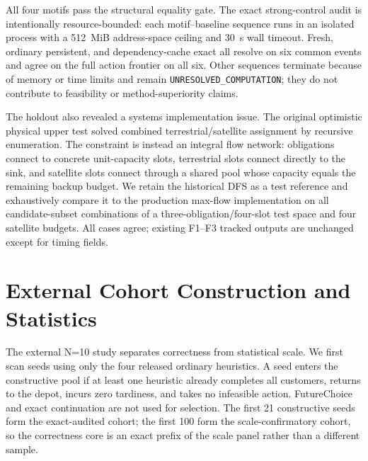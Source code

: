 \begin{table}[t]
\centering
\caption{B6 structural holdout. ``Inc.=fresh'' means every event-level incremental snapshot is canonically equal to a full fresh rebuild. Exact comparisons include only events where all three resource-bounded exact controls resolve.}
\label{tab:b6appendix}
\footnotesize

\end{table}

All four motifs pass the structural equality gate. The exact strong-control audit is intentionally resource-bounded: each motif--baseline sequence runs in an isolated process with a 512~MiB address-space ceiling and 30~s wall timeout. Fresh, ordinary persistent, and dependency-cache exact all resolve on six common events and agree on the full action frontier on all six. Other sequences terminate because of memory or time limits and remain \texttt{UNRESOLVED\_COMPUTATION}; they do not contribute to feasibility or method-superiority claims.

The holdout also revealed a systems implementation issue. The original optimistic physical upper test solved combined terrestrial/satellite assignment by recursive enumeration. The constraint is instead an integral flow network: obligations connect to concrete unit-capacity slots, terrestrial slots connect directly to the sink, and satellite slots connect through a shared pool whose capacity equals the remaining backup budget. We retain the historical DFS as a test reference and exhaustively compare it to the production max-flow implementation on all candidate-subset combinations of a three-obligation/four-slot test space and four satellite budgets. All cases agree; existing F1--F3 tracked outputs are unchanged except for timing fields.

\section{External Cohort Construction and Statistics}
\label{app:external}

The external N=10 study separates correctness from statistical scale. We first scan seeds using only the four released ordinary heuristics. A seed enters the constructive pool if at least one heuristic already completes all customers, returns to the depot, incurs zero tardiness, and takes no infeasible action. FutureChoice and exact continuation are not used for selection. The first 21 constructive seeds form the exact-audited cohort; the first 100 form the scale-confirmatory cohort, so the correctness core is an exact prefix of the scale panel rather than a different sample.


